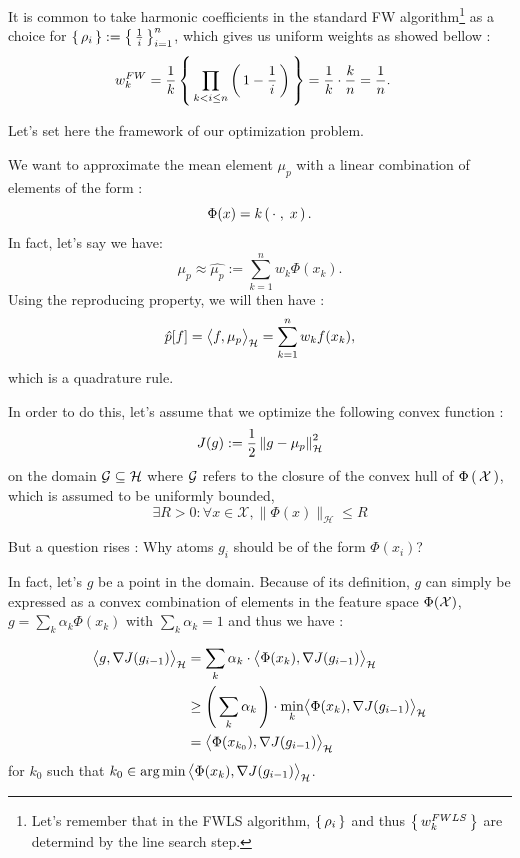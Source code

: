 It is common to take harmonic coefficients in the standard FW algorithm\footnote{Let's remember that in the FWLS algorithm, $\left \{ \, \rho_i \, \right \}$ and thus $\left \{ \, w_k^{FWLS} \, \right \}$ are
determind by the line search step.} as a choice for $\left \{ \, \rho_i \, \right \}:= \left \{ \, \frac{1}{i} \, \right \}_{i=1}^n$,
 which gives us uniform weights as showed bellow :
 \begin{align*}
w_k^{FW} &= \frac{1}{k} \left \{ \, \prod_{k<i\leq n} \left( \, 1-\frac{1}{i} \, \right) \, \right \}= \frac{1}{k} \cdot \frac{k}{n} = \frac{1}{n}.
\end{align*}

Let's set here the framework of our optimization problem.

\begin{boxproblem}
  We want to approximate the mean element $\mu_p$ with a linear combination of
  elements of the form :$$\Phi(x)= k\left( \, \cdot\;,\; x \, \right).$$
  In fact, let's say we have:
   $$\mu_p \approx \hat{\mu_p} := \sum_{k=1}^n w_k \Phi(x_k).$$
   Using the reproducing property, we will then have :
   $$\hat{p}[f]= \bigl \langle f , \mu_p \bigr \rangle_{\mathcal{H}} = \sum_{k=1}^n w_k f(x_k),$$
   which is a quadrature rule.

   In order to do this, let's assume that we optimize the following convex function :
   \begin{equation}
     J(g):= \frac{1}{2} \norme{g-\mu_p}^2
   \end{equation}
on the domain $\mathcal{G} \subseteq \mathcal{H}$ where $\mathcal{G}$ refers to the closure of the convex hull
of $\Phi\left( \, \mathcal{X} \, \right)$, which is assumed to be uniformly bounded, \ie
\begin{equation*}
  \exists R > 0 : \forall x \in \mathcal { X } , \| \Phi ( x ) \| _ { \mathcal { H } } \leq R
\end{equation*}

\end{boxproblem}
But a question rises : Why atoms $g_i$ should be of the form $\Phi(x_i)$?

In fact, let's
 $g$ be a point in the domain. Because of its definition,
  $g$ can simply be expressed as a convex combination of elements in the feature space $\Phi(\mathcal{X})$, \ie $g = \sum_k \alpha_k \Phi(x_k)$ with $\sum_k \alpha_k=1$ and thus we have :
  \begin{boxcomputation}
    \begin{align*}
      \bigl \langle g , \operatorname{\nabla\!}{J}(g_{i-1}) \bigr \rangle_{\mathcal{H}} &= \sum_k \alpha_k \cdot \bigl \langle \Phi(x_k) , \operatorname{\nabla\!}{J}(g_{i-1}) \bigr \rangle_{\mathcal{H}}\\
      &\geq \left( \, \sum_k \alpha_k \, \right) \cdot \min_{k} \bigl \langle \Phi(x_k) , \operatorname{\nabla\!}{J}(g_{i-1}) \bigr \rangle_{\mathcal{H}}\\
      &= \bigl \langle \Phi(x_{k_0}) , \operatorname{\nabla\!}{J}(g_{i-1}) \bigr \rangle_{\mathcal{H}}
    \end{align*}
    for $k_0$ such that $k_0 \in \operatorname*{arg\,min}{\bigl \langle \Phi(x_k) , \operatorname{\nabla\!}{J}(g_{i-1}) \bigr \rangle_{\mathcal{H}}}$.
  \end{boxcomputation}


